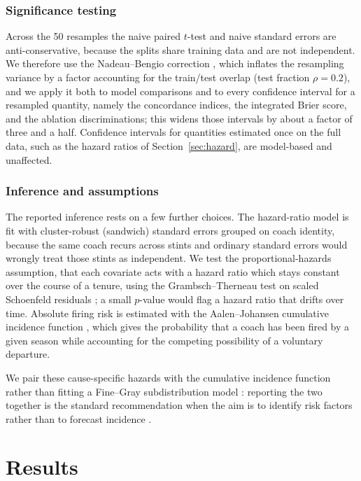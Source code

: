 \documentclass[USenglish]{article}
\theoremstyle{dgthm}
\theoremstyle{dgdef}
\begin{document}
\subsubsection{Significance testing}

Across the 50 resamples the naive paired $t$-test and naive standard errors are anti-conservative, because the splits share training data and are not independent. We therefore use the Nadeau--Bengio correction \citep{nadeau2003}, which inflates the resampling variance by a factor accounting for the train/test overlap (test fraction $\rho = 0.2$), and we apply it both to model comparisons and to every confidence interval for a resampled quantity, namely the concordance indices, the integrated Brier score, and the ablation discriminations; this widens those intervals by about a factor of three and a half. Confidence intervals for quantities estimated once on the full data, such as the hazard ratios of Section~\ref{sec:hazard}, are model-based and unaffected.

\subsubsection{Inference and assumptions}

The reported inference rests on a few further choices. The hazard-ratio model is fit with cluster-robust (sandwich) standard errors \citep{lin1989} grouped on coach identity, because the same coach recurs across stints and ordinary standard errors would wrongly treat those stints as independent. We test the proportional-hazards assumption, that each covariate acts with a hazard ratio which stays constant over the course of a tenure, using the Grambsch--Therneau test on scaled Schoenfeld residuals \citep{grambsch1994}; a small $p$-value would flag a hazard ratio that drifts over time. Absolute firing risk is estimated with the Aalen--Johansen cumulative incidence function \citep{aalen1978}, which gives the probability that a coach has been fired by a given season while accounting for the competing possibility of a voluntary departure.

We pair these cause-specific hazards with the cumulative incidence function rather than fitting a Fine--Gray subdistribution model \citep{finegray1999}: reporting the two together is the standard recommendation when the aim is to identify risk factors rather than to forecast incidence \citep{austin2016}.

\section{Results}
\end{document}
